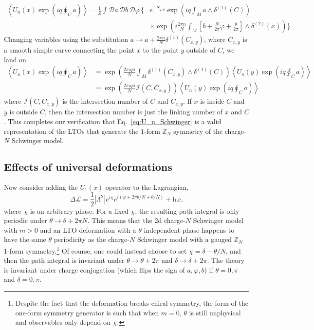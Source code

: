 \documentclass[11pt]{article}
\def\ZN{\mathbb{Z}_N}
\def\coeff#1#2{{\textstyle {\frac {#1}{#2}}}}
\def\half{\coeff 12}
\begin{document}
\begin{align}
\left\langle U_n(x) \exp{\left(i q \oint_C a\right)} \right\rangle
= \frac{1}{Z} \int \mathcal{D} a\, \mathcal{D} b\,\mathcal{D}\varphi \,\bigg\{& e^{-S_{\varphi, b}}
\exp\left(i q \int_M a \wedge \delta^{(1)}(C) \right)  \\
&\times\exp\left(  i\frac{2\pi n}{N} \int_M \left[b +\frac{N}{2\pi}\varphi +\frac{\theta}{2\pi}\right] \wedge \delta^{(2)}(x) \right) \bigg\}\nonumber
\end{align}
Changing variables using the substitution $a \to a + \frac{2\pi n}{N} \delta^{(1)}(C_{x,y})$, where $C_{x,y}$ is a smooth simple curve connecting the point $x$ to the point $y$ outside of $C$, we land on
\begin{align}
\left\langle U_n(x) \exp{\left(i q \oint_C a\right)} \right\rangle
&= \exp\left( \frac{2\pi i q n}{N} \int_M \delta^{(1)}(C_{x,y}) \wedge \delta^{(1)}(C) \right)
 \left\langle U_n(y) \exp{\left(i q \oint_C a\right)} \right\rangle  \nonumber\\
&= \exp\left( \frac{2\pi i q n}{N} \mathcal{I}(C, C_{x,y}) \right)
 \left\langle U_n(y) \exp{\left(i q \oint_C a\right)} \right\rangle 
\end{align}
where $\mathcal{I}(C, C_{x,y})$ is the intersection number of $C$ and $C_{x,y}$.  If $x$ is inside $C$ and $y$ is outside $C$, then the intersection number is just the linking number of $x$ and $C$.  This completes our verification that Eq.~\eqref{eq:U_n_Schwinger} is a valid representation of the LTOs that generate the $1$-form $\mathbb{Z}_N$ symmetry of the charge-$N$ Schwinger model.

\subsection{Effects of universal deformations}

Now consider adding the $U_1(x)$ operator to the Lagrangian,
\begin{equation} 
\label{eq:Schwinger_def}
\Delta \mathcal{L} = \half|\Lambda^2| e^{i\chi}e^{i\left(\varphi +2\pi b/N + \theta/N\right)} + \textrm{h.c.}
\end{equation}
where $\chi$ is an arbitrary phase. For a fixed $\chi$, the resulting path integral is only periodic under $\theta \to \theta + 2\pi N$. This means that the 2d charge-$N$ Schwinger model with $m>0$ and an LTO deformation with a $\theta$-independent phase happens to have the same  $\theta$ periodicity as the charge-$N$ Schwinger model with a gauged $\ZN$ 1-form symmetry.\footnote{Despite the fact that the deformation breaks chiral symmetry, the form of the one-form symmetry generator is such that when $m =0$, $\theta$ is still unphysical and observables only depend on $\chi$. } Of course, one could instead choose to  set $\chi = \delta - \theta/N$, and then the path integral is invariant under $\theta \to \theta + 2\pi$ and $\delta \to \delta + 2\pi$. The theory is invariant under charge conjugation (which flips the sign of $a,\varphi,b$) if $\theta = 0, \pi$ and $\delta = 0, \pi$. 
\end{document}

